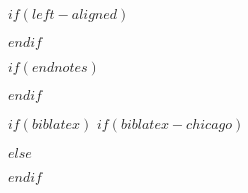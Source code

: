 
\usepackage{etoolbox}


$if(left-aligned)$
\usepackage[document]{ragged2e}
\setlength{\RaggedRightParindent}{\parindent}
\setlength{\RaggedRightRightskip}{0pt plus 3em}

$endif$

$if(endnotes)$
\usepackage{endnotes}
\renewcommand{\enotesize}{\normalsize}
\let\footnote=\endnote
$endif$


\usepackage{fancyhdr}
\setlength{\headheight}{0.25in}
\renewcommand{\headrulewidth}{0pt}  %
\renewcommand{\footrulewidth}{0pt}



\pagestyle{normal}

$if(biblatex)$
$if(biblatex-chicago)$
\usepackage[$if(biblio-style)$$biblio-style$,$endif$$for(biblatexoptions)$$biblatexoptions$$sep$,$endfor$]{biblatex-chicago}
$else$
\usepackage[$if(biblio-style)$style=$biblio-style$,$endif$$for(biblatexoptions)$$biblatexoptions$$sep$,$endfor$]{biblatex}
$endif$

\setlength\bibitemsep{0pt}  %
\setlength\bibhang{\parindent}  %


